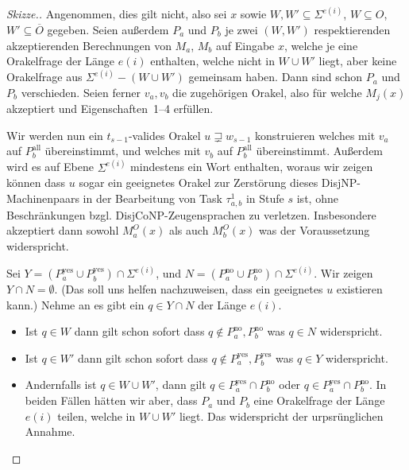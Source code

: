 \documentclass[nofonts]{uebung}
\begin{document}
\begin{proof}[Skizze.]
    Angenommen, dies gilt nicht, also sei $x$ sowie $W,W'\subseteq \Sigma^{e(i)}$, $W\subseteq O$, $W'\subseteq\overline{O}$ gegeben.
    Seien außerdem $P_a$ und $P_b$ je zwei $(W, W')$ respektierenden akzeptierenden Berechnungen von $M_a$, $M_b$ auf Eingabe $x$,
    welche je eine Orakelfrage der Länge $e(i)$ enthalten, welche nicht in $W\cup W'$ liegt,
    aber keine Orakelfrage aus $\Sigma^{e(i)}-(W\cup W')$ gemeinsam haben.
    Dann sind schon $P_a$ und $P_b$ verschieden.
    Seien ferner $v_a, v_b$ die zugehörigen Orakel, also für welche $M_j(x)$ akzeptiert und Eigenschaften~1--4 erfüllen.

    Wir werden nun ein $t_{s-1}$-valides Orakel $u\sqsupsetneq w_{s-1}$ konstruieren welches mit $v_a$ auf $P^\mathrm{all}_b$ übereinstimmt, und welches mit $v_b$ auf $P^\mathrm{all}_b$ übereinstimmt.
    Außerdem wird es auf Ebene $\Sigma^{e(i)}$ mindestens ein Wort enthalten, woraus wir zeigen können dass $u$ sogar ein geeignetes Orakel zur Zerstörung dieses DisjNP-Machinenpaars in der Bearbeitung von Task $\tau^1_{a,b}$ in Stufe $s$ ist, ohne Beschränkungen bzgl. DisjCoNP-Zeugensprachen zu verletzen. Insbesondere akzeptiert dann sowohl $M_a^O(x)$ als auch $M_b^O(x)$ was der Voraussetzung widerspricht.

    Sei $Y=(P^\mathrm{yes}_a\cup P^\mathrm{yes}_b)\cap\Sigma^{e(i)}$, und $N=(P^\mathrm{no}_a\cup P^\mathrm{no}_b)\cap\Sigma^{e(i)}$.
    Wir zeigen $Y\cap N = \emptyset$. (Das soll uns helfen nachzuweisen, dass ein geeignetes $u$ existieren kann.)
    Nehme an es gibt ein $q\in Y\cap N$ der Länge $e(i)$.
    \begin{itemize}[noitemsep]
        \item Ist $q\in W$ dann gilt schon sofort dass $q\not\in P^\mathrm{no}_a, P^\mathrm{no}_b$ was $q\in N$ widerspricht.
        \item Ist $q\in W'$ dann gilt schon sofort dass $q\not\in P^\mathrm{yes}_a, P^\mathrm{yes}_b$ was $q\in Y$ widerspricht.
        \item Andernfalls ist $q\in  W\cup W'$, dann gilt $q\in P^\mathrm{yes}_a\cap P^\mathrm{no}_b$ oder $q\in P^\mathrm{yes}_a\cap P^\mathrm{no}_b$.
            In beiden Fällen hätten wir aber, dass $P_a$ und $P_b$ eine Orakelfrage der Länge $e(i)$ teilen, welche in $W\cup W'$ liegt. Das widerspricht der urpsrünglichen Annahme.
    \end{itemize}


\end{proof}
\end{document}
